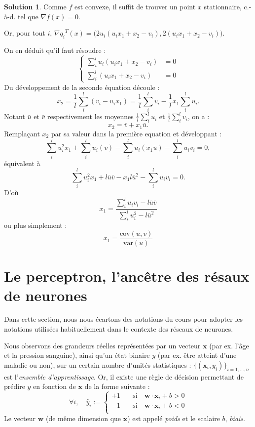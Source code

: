\documentclass[a4paper,francais]{article}
\newcommand{\cad}{c.-à-d.}
\theoremstyle{definition}
\newtheorem*{solution}{Solution}
\begin{document}
\begin{solution}
  Comme $f$ est convexe, il suffit de trouver un point $x$ stationnaire,
  {\cad} tel que $\nabla f(x) = 0$.

  Or, pour tout $i$, ${\nabla q_i}^T(x) = \big( 2u_i (u_ix_1 + x_2 - v_i), 2(u_ix_1 + x_2 - v_i) \big)$.

  On en déduit qu'il faut résoudre :
  \[
  \left\{
  \begin{array}{cc}
    \sum_i^l u_i (u_ix_1 + x_2 - v_i) &= 0 \\
    \sum_i^l (u_ix_1 + x_2 - v_i) &= 0
  \end{array}
  \right.
  \]
  Du développement de la seconde équation découle :
  \[
  x_2 = \frac{1}{l} \sum_i^l (v_i - u_ix_1) = \frac{1}{l} \sum_i^l v_i - \frac{1}{l} x_1\sum_i^l u_i. 
  \]
  Notant $\bar{u}$ et $\bar{v}$ respectivement les moyennes $\frac{1}{l} \sum_i^l u_i$ et $\frac{1}{l} \sum_i^l v_i$, on a :
  \[
  x_2 = \bar{v} + x_1 \bar{u}.
  \]
  Remplaçant $x_2$ par sa valeur dans la première equation et développant :
  \[
  \sum_i^l u_i^2 x_1 + \sum_i^l u_i (\bar{v}) - \sum_i^l u_i (x_1\bar{u}) - \sum_i^l u_iv_i = 0,
  \]
  équivalent à 
  \[
  \sum_i^l u_i^2 x_1 + l\bar{u}\bar{v} - x_1 l{\bar{u}}^2  - \sum_i^l u_iv_i = 0.
  \]
  D'où
  \[
  x_1 = \frac{\sum_i^l u_iv_i - l\bar{u}\bar{v}}{\sum_i^l u_i^2 - l{\bar{u}}^2}
  \]
  ou plus simplement :
  \[
  x_1 = \frac{ \text{cov}(u,v) }{ \text{var}(u) } 
  \]
  
\end{solution}

\section{Le perceptron, l'ancêtre des résaux de neurones}

\let\vec\mathbf

Dans cette section, nous nous écartons des notations du cours pour adopter les
notations utilisées habituellement dans le contexte des réseaux de neurones.

Nous observons des grandeurs réelles représentées par un vecteur $\vec{x}$
(par ex. l'âge et la pression sanguine), ainsi qu'un état binaire $y$
(par ex. être atteint d'une maladie ou non), sur un certain nombre d'unités
statistiques : $\{(\vec{x}_i,y_i)\}_{i = 1,\dots, n}$ est l'\emph{ensemble d'apprentissage}.
Or, il existe une règle de décision permettant de prédire $y$ en fonction de $\vec{x}$
de la forme suivante :
\[
\forall i, \quad
\hat{y}_i :=
\left\{
\begin{array}{ll}
  +1 & \quad \mathrm{si}\quad \vec{w}\cdot\vec{x}_i + b > 0 \\
  -1 & \quad \mathrm{si}\quad \vec{w}\cdot\vec{x}_i + b < 0 \\
\end{array}
\right.
\]
Le vecteur $\vec{w}$ (de même dimension que $\vec{x}$)
est appelé \emph{poids} et le scalaire $b$, \emph{biais}.
\end{document}
